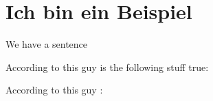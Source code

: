 \documentclass[12pt,oneside,paper=a4,ngerman]{scrartcl}
\begin{document}
\section{Ich bin ein Beispiel}

We have a sentence \cite[12]{Knuth:1997:ACP:260999}

According to this guy \citet[1]{Knuth:1997:ACP:260999} is the following stuff true:
\begin{quote}
    \blindtext
\end{quote}
According to this guy \citep[1]{Knuth:1997:ACP:260999}:
\begin{quote}
    \blindtext
\end{quote}
\clearpage
\printbibliography
\end{document}
